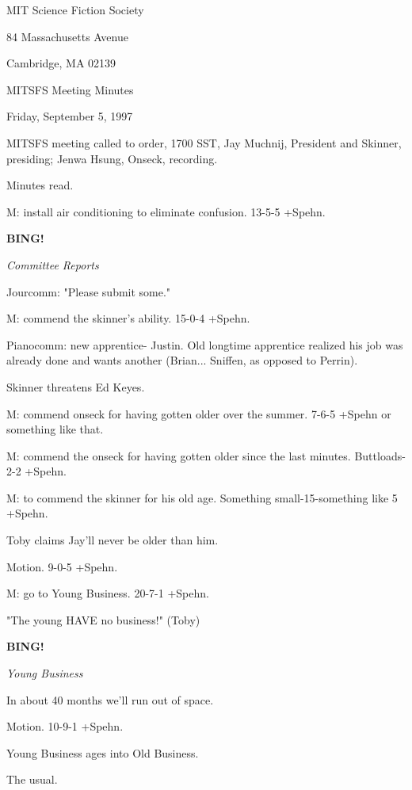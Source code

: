 \documentclass[12pt]{article}
\newcommand{\bing}{{\bf BING!} }
\newcommand{\goto}[1]{\bing \vskip 12pt \centerline{{\em{#1}}}}
\begin{document}
\begin{center}

MIT Science Fiction Society 

84 Massachusetts Avenue

Cambridge, MA 02139

\vspace{12pt}

MITSFS Meeting Minutes 

Friday, September 5, 1997

\end{center}
 
\vspace{18pt}

\setlength{\parskip}{6pt}

\noindent
MITSFS meeting called to order, 1700 SST,
Jay Muchnij, President and Skinner, presiding; Jenwa Hsung, Onseck, recording.

Minutes read.

M: install air conditioning to eliminate confusion. 13-5-5 +Spehn.

\goto{Committee Reports}

Jourcomm: "Please submit some."

M: commend the skinner's ability. 15-0-4 +Spehn.

Pianocomm: new apprentice- Justin. Old longtime apprentice realized his job was already done and wants another (Brian... Sniffen, as opposed to Perrin).

Skinner threatens Ed Keyes.

M: commend onseck for having gotten older over the summer. 7-6-5 +Spehn or something like that.

M: commend the onseck for having gotten older since the last minutes. Buttloads-2-2 +Spehn.

M: to commend the skinner for his old age. Something small-15-something like 5 +Spehn.

Toby claims Jay'll never be older than him.

Motion. 9-0-5 +Spehn.

M: go to Young Business. 20-7-1 +Spehn.

"The young HAVE no business!" (Toby)

\goto{Young Business}

In about 40 months we'll run out of space.

Motion. 10-9-1 +Spehn.

Young Business ages into Old Business.

The usual.
\end{document}
